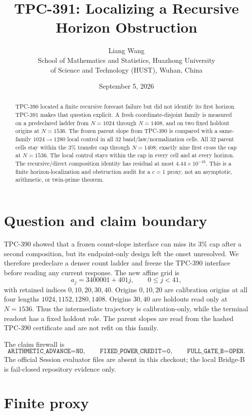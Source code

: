 \documentclass[10pt]{article}
\title{TPC-391: Localizing a Recursive Horizon Obstruction}
\author{Liang Wang\\
School of Mathematics and Statistics, Huazhong University\\
of Science and Technology (HUST), Wuhan, China}
\date{September 5, 2026}
\begin{document}
\maketitle

\begin{abstract}
TPC-390 located a finite recursive forecast failure but did not identify its
first horizon.  TPC-391 makes that question explicit.  A fresh
coordinate-disjoint family is measured on a predeclared ladder from
$N=1024$ through $N=1408$, and on two fixed holdout origins at $N=1536$.
The frozen parent slope from TPC-390 is compared with a same-family
$1024\mathbin{\to}1280$ local control in all 32 band/law/normalization cells.
All 32 parent cells stay within the $3\%$ transfer cap through $N=1408$;
exactly nine first cross the cap at $N=1536$.  The local control stays within
the cap in every cell and at every horizon.  The recursive/direct composition
identity has residual at most $4.44\times10^{-16}$.  This is a finite
horizon-localization and obstruction audit for a $c=1$ proxy, not an
asymptotic, arithmetic, or twin-prime theorem.
\end{abstract}

\section{Question and claim boundary}

TPC-390 showed that a frozen count-slope interface can miss its $3\%$ cap
after a second composition, but its endpoint-only design left the onset
unresolved.  We therefore predeclare a denser count ladder and freeze the
TPC-390 interface before reading any current response.  The new affine grid is
\[
 a_j=3400001+401j,\qquad 0\leq j<41,
\]
with retained indices $0,10,20,30,40$.  Origins $0,10,20$ are calibration
origins at all four lengths $1024,1152,1280,1408$.  Origins $30,40$ are
holdouts read only at $N=1536$.  Thus the intermediate trajectory is
calibration-only, while the terminal readout has a fixed holdout role.
The parent slopes are read from the hashed TPC-390 certificate and are not
refit on this family.

The claim firewall is
\[
 \texttt{ARITHMETIC\_ADVANCE=NO},\qquad
 \texttt{FIXED\_POWER\_CREDIT=0},\qquad
 \texttt{FULL\_GATE\_B=OPEN}.
\]
The official Session evaluator files are absent in this checkout; the local
Bridge-B is fail-closed repository evidence only.

\section{Finite proxy}
\end{document}
